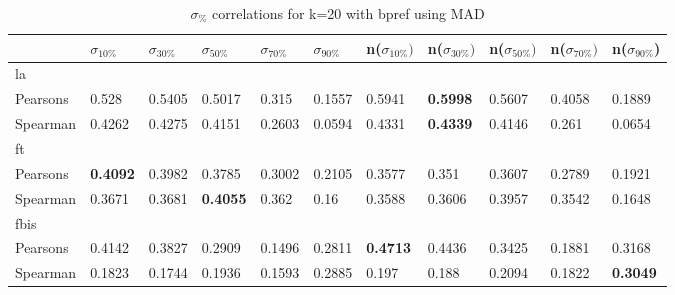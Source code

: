 \documentclass{sig-alternate}
\begin{document}
\begin{table}[h!]
\centering
\begin{tabular}{|l||l|l|l|l|l||l|l|l|l|l|}
\hline
& $\sigma_{10\%}$ & $\sigma_{30\%}$ & $\sigma_{50\%}$ & $\sigma_{70\%}$ & $\sigma_{90\%}$ & n($\sigma_{10\%})$ & n($\sigma_{30\%})$ & n($\sigma_{50\%})$ & n($\sigma_{70\%})$ & n($\sigma_{90\%}$) \\ \hline
\hline la &  &  &  &  &  &  &  &  &  &  \\ \hline
Pearsons & 0.528 & 0.5405 & 0.5017 & 0.315 & 0.1557 & 0.5941 & \textbf{0.5998} & 0.5607 & 0.4058 & 0.1889 \\ \hline
Spearman & 0.4262 & 0.4275 & 0.4151 & 0.2603 & 0.0594 & 0.4331 & \textbf{0.4339} & 0.4146 & 0.261 & 0.0654 \\ \hline
\hline ft &  &  &  &  &  &  &  &  &  &  \\ \hline
Pearsons & \textbf{0.4092} & 0.3982 & 0.3785 & 0.3002 & 0.2105 & 0.3577 & 0.351 & 0.3607 & 0.2789 & 0.1921 \\ \hline
Spearman & 0.3671 & 0.3681 & \textbf{0.4055} & 0.362 & 0.16 & 0.3588 & 0.3606 & 0.3957 & 0.3542 & 0.1648 \\ \hline
\hline fbis &  &  &  &  &  &  &  &  &  &  \\ \hline
Pearsons & 0.4142 & 0.3827 & 0.2909 & 0.1496 & 0.2811 & \textbf{0.4713} & 0.4436 & 0.3425 & 0.1881 & 0.3168 \\ \hline
Spearman & 0.1823 & 0.1744 & 0.1936 & 0.1593 & 0.2885 & 0.197 & 0.188 & 0.2094 & 0.1822 & \textbf{0.3049} \\ \hline
\end{tabular}
\caption{$\sigma_{\%}$ correlations for k=20 with bpref using MAD}
\end{table}
\end{document}

